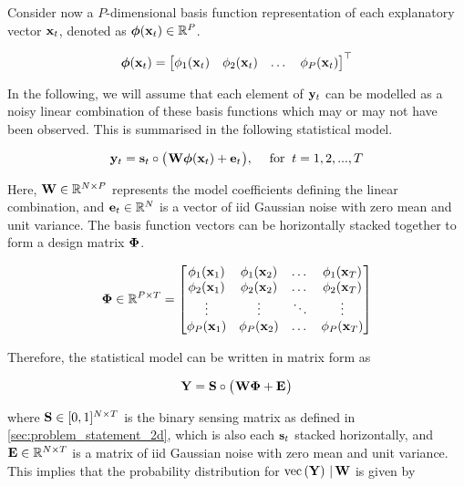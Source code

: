 Consider now a $P$-dimensional basis function representation of each explanatory vector $\mathbf{x}_t$, denoted as $\boldsymbol{\phi}(\mathbf{x}_t) \in \mathbb{R}^{P}$. 

\begin{equation}
    \boldsymbol{\phi}(\mathbf{x}_t) = 
    \begin{bmatrix}
        \phi_1(\mathbf{x}_t) & \phi_2(\mathbf{x}_t) & \dots & \phi_P(\mathbf{x}_t)
    \end{bmatrix}^\top
\end{equation}

In the following, we will assume that each element of $\mathbf{y}_t$ can be modelled as a noisy linear combination of these basis functions which may or may not have been observed. This is summarised in the following statistical model. 

\begin{equation}
    \mathbf{y}_t = \mathbf{s}_t \circ \big( \mspace{1mu} \mathbf{W} \boldsymbol{\phi}(\mathbf{x}_t) + \mathbf{e}_t \mspace{1mu} \big), \quad \; \text{for} \; \; t = 1, 2, ..., T
\end{equation}

Here, $\mathbf{W} \in \mathbb{R}^{N \times P}$ represents the model coefficients defining the linear combination, and $\mathbf{e}_t \in \mathbb{R}^{N}$ is a vector of iid Gaussian noise with zero mean and unit variance. The basis function vectors can be horizontally stacked together to form a design matrix $\mathbf{\Phi}$. 

\begin{equation}
    \mathbf{\Phi} \in \mathbb{R}^{P \times T} = \begin{bmatrix} 
        \phi_1(\mathbf{x}_1) & \phi_1(\mathbf{x}_2) & \dots & \phi_1(\mathbf{x}_T) \\
        \phi_2(\mathbf{x}_1) & \phi_2(\mathbf{x}_2) & \dots & \phi_2(\mathbf{x}_T) \\
        \vdots & \vdots & \ddots & \vdots  \\
        \phi_P(\mathbf{x}_1) & \phi_P(\mathbf{x}_2) & \dots & \phi_P(\mathbf{x}_T) \\
    \end{bmatrix}
\end{equation}

Therefore, the statistical model can be written in matrix form as 


\begin{equation}
    \mathbf{Y} = \mathbf{S} \circ \big( \mspace{1mu} \mathbf{W} \mathbf{\Phi} + \mathbf{E} \mspace{1mu} \big)
\end{equation}

where $\mathbf{S} \in [0, 1]^{N \times T}$ is the binary sensing matrix as defined in \cref{sec:problem_statement_2d}, which is also each $\mathbf{s}_t$ stacked horizontally, and $\mathbf{E} \in \mathbb{R}^{N \times T}$ is a matrix of iid Gaussian noise with zero mean and unit variance. This implies that the probability distribution for $\text{\textup{vec}}\left(\mathbf{Y}\right) \, | \, \mathbf{W}$ is given by 

